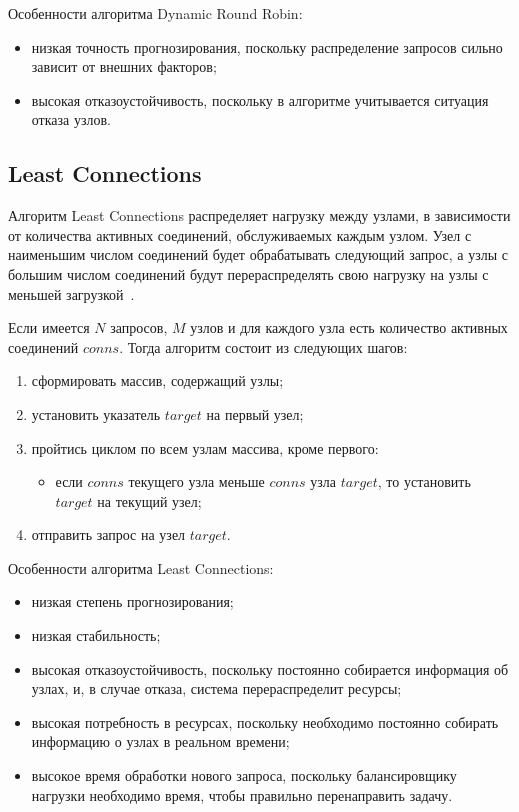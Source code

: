 Особенности алгоритма Dynamic Round Robin:
\begin{itemize}
	\item низкая точность прогнозирования, поскольку распределение запросов сильно зависит от внешних факторов;
	\item высокая отказоустойчивость, поскольку в алгоритме учитывается ситуация отказа узлов.
\end{itemize}


\subsection{Least Connections}

Алгоритм Least Connections распределяет нагрузку между узлами, в зависимости от количества активных соединений, обслуживаемых каждым узлом.
Узел с наименьшим числом соединений будет обрабатывать следующий запрос, а узлы с большим числом соединений будут перераспределять свою нагрузку на узлы с меньшей загрузкой~\cite{leastconnection}.

Если имеется $N$ запросов, $M$ узлов и для каждого узла есть количество активных соединений $conns$. 
Тогда алгоритм состоит из следующих шагов:
\begin{enumerate}
	\item сформировать массив, содержащий узлы;
	\item установить указатель $target$ на первый узел;
	\item пройтись циклом по всем узлам массива, кроме первого:
	\begin{itemize}
		\item если $conns$ текущего узла меньше $conns$ узла $target$, то установить $target$ на текущий узел; 
	\end{itemize}
	\item отправить запрос на узел $target$.
\end{enumerate}

Особенности алгоритма Least Connections:
\begin{itemize}
	\item низкая степень прогнозирования; 
	\item низкая стабильность;
	\item высокая отказоустойчивость, поскольку постоянно собирается информация об узлах, и, в случае отказа, система перераспределит ресурсы;
	\item высокая потребность в ресурсах, поскольку необходимо постоянно собирать информацию о узлах в реальном времени;
	\item высокое время обработки нового запроса, поскольку балансировщику нагрузки необходимо время, чтобы правильно перенаправить задачу.
\end{itemize}

